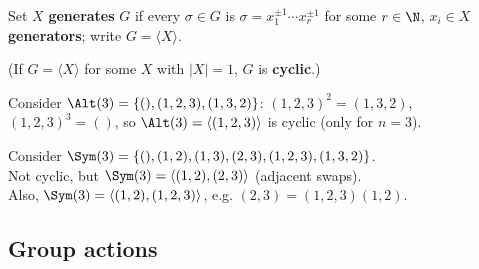\begin{slide}
    \begin{definition}[generator]
        \vspace{0pt}
        Set $X$ \textbf{generates} $G$ if every $\sigma \in G$ is $\sigma = x_1^{\pm 1} \dotsb x_r^{\pm 1}$ for some $r \in \N$, $x_i \in X$ \textbf{generators}; write $G = \langle X \rangle$. \pause

        (If $G = \langle X \rangle$ for some $X$ with $|X| = 1$, $G$ is \textbf{cyclic}.)
    \end{definition} \pause

    \begin{example}
        \vspace{0pt}
        Consider $\Alt(3) = \{(),(1,2,3),(1,3,2)\}$: $(1,2,3)^2 = (1,3,2)$, $(1,2,3)^3 = ()$, so $\Alt(3) = \langle(1,2,3)\rangle$ is cyclic (only for $n = 3$).
    \end{example}

    \begin{example}
        \vspace{0pt}
        Consider $\Sym(3) = \{(),(1,2),(1,3),(2,3),(1,2,3),(1,3,2)\}$. \\
        Not cyclic, but $\Sym(3) = \langle(1,2),(2,3)\rangle$ (adjacent swaps). \\
        Also, $\Sym(3) = \langle(1,2),(1,2,3)\rangle$, e.g. $(2,3) = (1,2,3)(1,2)$.
    \end{example}
\end{slide}

\subsection{Group actions}

